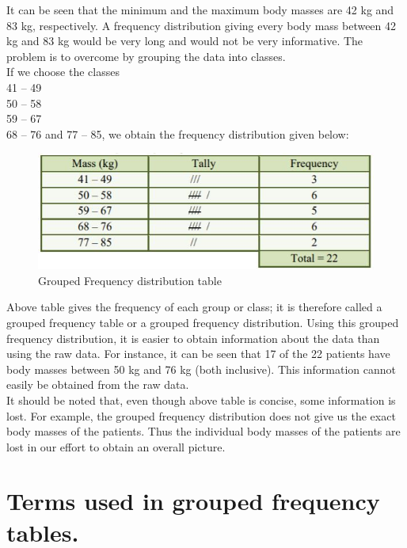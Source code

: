 \documentclass[
]{book}
\begin{document}
It can be seen that the minimum and the maximum body masses are 42 kg
and 83 kg, respectively. A frequency distribution giving every body mass
between 42 kg and 83 kg would be very long and would not be very
informative. The problem is to overcome by grouping the data into
classes.\\
If we choose the classes\\
41 -- 49\\
50 -- 58\\
59 -- 67\\
68 -- 76 and 77 -- 85, we obtain the frequency distribution given below:

\begin{figure}

{\centering \includegraphics[width=0.9\linewidth]{images/image6} 

}

\caption{Grouped Frequency distribution table}\label{fig:grptable}
\end{figure}

Above table gives the frequency of each group or class; it is therefore
called a grouped frequency table or a grouped frequency distribution.
Using this grouped frequency distribution, it is easier to obtain
information about the data than using the raw data. For instance, it can
be seen that 17 of the 22 patients have body masses between 50 kg and 76
kg (both inclusive). This information cannot easily be obtained from the
raw data.\\
It should be noted that, even though above table is concise, some
information is lost. For example, the grouped frequency distribution
does not give us the exact body masses of the patients. Thus the
individual body masses of the patients are lost in our effort to obtain
an overall picture.

\hypertarget{terms-used-in-grouped-frequency-tables.}{%
\section{Terms used in grouped frequency tables.}\label{terms-used-in-grouped-frequency-tables.}}
\end{document}
